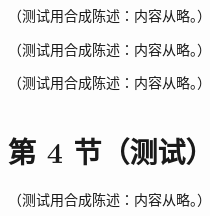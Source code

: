 \begin{theorem}\label{thm:appK-muntz}
（测试用合成陈述：内容从略。）
\end{theorem}

\begin{lemma}[受控增长的整函数]\label{lem:appK-entire}
（测试用合成陈述：内容从略。）
\end{lemma}

\begin{lemma}\label{lem:appK-markov}
（测试用合成陈述：内容从略。）
\end{lemma}

\section{第 4 节（测试）}\label{sec:appK-counterexamples}

\begin{remark}[反例与稳定性]\label{rem:appK-counterexamples}
（测试用合成陈述：内容从略。）
\end{remark}
